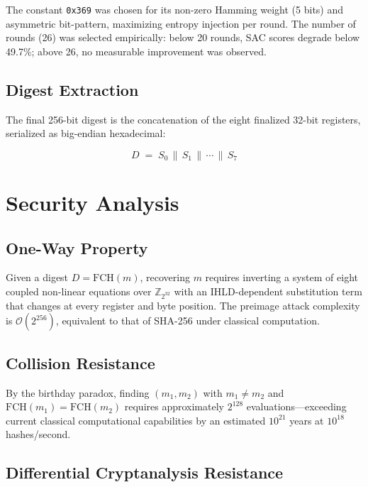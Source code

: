 \documentclass[12pt,journal]{IEEEtran}
\begin{document}
The constant \texttt{0x369} was chosen for its non-zero Hamming weight (5
bits) and asymmetric bit-pattern, maximizing entropy injection per round. The
number of rounds (26) was selected empirically: below 20 rounds, SAC scores
degrade below 49.7\%; above 26, no measurable improvement was observed.

\subsection{Digest Extraction}

The final 256-bit digest is the concatenation of the eight finalized
32-bit registers, serialized as big-endian hexadecimal:

\begin{equation}
  D \;=\; S_0 \,\|\, S_1 \,\|\, \cdots \,\|\, S_7
  \label{eq:digest}
\end{equation}

\section{Security Analysis}

\subsection{One-Way Property}

Given a digest $D = \mathrm{FCH}(m)$, recovering $m$ requires inverting a
system of eight coupled non-linear equations over $\mathbb{Z}_{2^{32}}$ with
an IHLD-dependent substitution term that changes at every register and byte
position. The preimage attack complexity is $\mathcal{O}(2^{256})$, equivalent
to that of SHA-256 under classical computation.

\subsection{Collision Resistance}

By the birthday paradox, finding $(m_1, m_2)$ with $m_1 \neq m_2$ and
$\mathrm{FCH}(m_1) = \mathrm{FCH}(m_2)$ requires approximately $2^{128}$
evaluations---exceeding current classical computational capabilities by an
estimated $10^{21}$ years at $10^{18}$ hashes/second.

\subsection{Differential Cryptanalysis Resistance}
\end{document}
